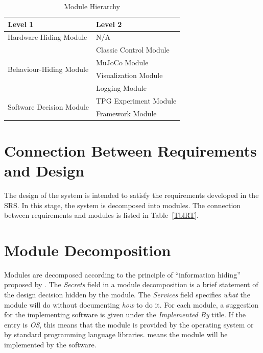 \documentclass[12pt, titlepage]{article}
\begin{document}
\begin{table}[h!]
\centering
\begin{tabular}{p{} p{}}
\toprule
\textbf{Level 1} & \textbf{Level 2}\\
\midrule

{Hardware-Hiding Module} & N/A \\
\midrule

\multirow{4}{0.3\textwidth}{Behaviour-Hiding Module} & Classic Control Module \\
& MuJoCo Module\\
& Visualization Module\\
& Logging Module\\
\midrule

\multirow{2}{0.3\textwidth}{Software Decision Module} & {TPG Experiment Module}\\
& Framework Module\\
\bottomrule

\end{tabular}
\caption{Module Hierarchy}
\label{TblMH}
\end{table}

\section{Connection Between Requirements and Design} \label{SecConnection}

The design of the system is intended to satisfy the requirements developed in
the SRS. In this stage, the system is decomposed into modules. The connection
between requirements and modules is listed in Table~\ref{TblRT}.


\section{Module Decomposition} \label{SecMD}

Modules are decomposed according to the principle of ``information hiding''
proposed by \citet{ParnasEtAl1984}. The \emph{Secrets} field in a module
decomposition is a brief statement of the design decision hidden by the
module. The \emph{Services} field specifies \emph{what} the module will do
without documenting \emph{how} to do it. For each module, a suggestion for the
implementing software is given under the \emph{Implemented By} title. If the
entry is \emph{OS}, this means that the module is provided by the operating
system or by standard programming language libraries.  \emph{\progname{}} means the
module will be implemented by the \progname{} software.
\end{document}
